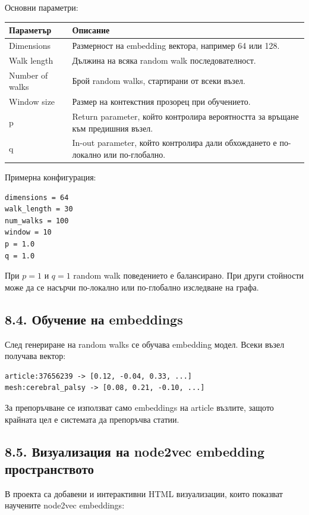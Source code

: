 \documentclass[12pt,a4paper]{article}
\begin{document}
Основни параметри:

\begin{longtable}{p{}p{}}
\toprule
\textbf{Параметър} & \textbf{Описание} \\
\midrule
Dimensions & Размерност на embedding вектора, например 64 или 128. \\
Walk length & Дължина на всяка random walk последователност. \\
Number of walks & Брой random walks, стартирани от всеки възел. \\
Window size & Размер на контекстния прозорец при обучението. \\
p & Return parameter, който контролира вероятността за връщане към предишния възел. \\
q & In-out parameter, който контролира дали обхождането е по-локално или по-глобално. \\
\bottomrule
\end{longtable}

Примерна конфигурация:

\begin{verbatim}
dimensions = 64
walk_length = 30
num_walks = 100
window = 10
p = 1.0
q = 1.0
\end{verbatim}

При $p=1$ и $q=1$ random walk поведението е балансирано. При други стойности може да се насърчи по-локално или по-глобално изследване на графа.

\subsection{8.4. Обучение на embeddings}

След генериране на random walks се обучава embedding модел. Всеки възел получава вектор:

\begin{verbatim}
article:37656239 -> [0.12, -0.04, 0.33, ...]
mesh:cerebral_palsy -> [0.08, 0.21, -0.10, ...]
\end{verbatim}

За препоръчване се използват само embeddings на article възлите, защото крайната цел е системата да препоръчва статии.

\subsection{8.5. Визуализация на node2vec embedding пространството}

В проекта са добавени и интерактивни HTML визуализации, които показват научените node2vec embeddings:
\end{document}

